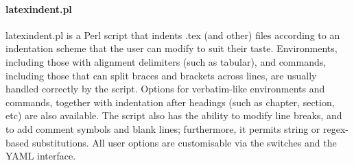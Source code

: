 \paragraph{latexindent.pl}
latexindent.pl is a Perl script that indents .tex (and other) files according to an indentation
scheme that the user can modify to suit their taste. Environments, including those with alignment
delimiters (such as tabular), and commands, including those that can split braces and
brackets across lines, are usually handled correctly by the script. Options for verbatim-like environments
and commands, together with indentation after headings (such as chapter, section,
etc) are also available. The script also has the ability to modify line breaks, and to add comment
symbols and blank lines; furthermore, it permits string or regex-based substitutions. All user
options are customisable via the switches and the YAML interface.
